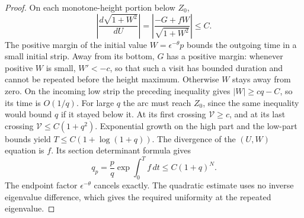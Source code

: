 \begin{proof}
On each monotone-height portion below $Z_0$,
\[
 \left|\frac{d\sqrt{1+W^2}}{dU}\right|
 =\left|\frac{-G+fW}{\sqrt{1+W^2}}\right|\le C.
\]
The positive margin of the initial value
$W=\epsilon^{-\theta}p$ bounds the outgoing time in a small initial
strip.
Away from its bottom, $G$ has a positive margin: whenever positive
$W$ is small, $W'<-c$, so that such a visit has bounded duration
and cannot be repeated before the height maximum. Otherwise $W$
stays away from zero. On the incoming low strip the preceding
inequality gives $|W|\ge cq-C$, so its time is $O(1/q)$.
For large $q$ the arc must reach $Z_0$, since the same inequality
would bound $q$ if it stayed below it. At its first crossing
$\mathcal V\ge c$, and at its last crossing
$\mathcal V\le C(1+q^2)$. Exponential growth on the high part and
the low-part bounds yield $T\le C(1+\log(1+q))$.
The divergence of the $(U,W)$ equation is $f$. Its section determinant
formula gives
\[
 q_p=\frac pq\exp\int_0^T f\,dt\le C(1+q)^N.
\]
The endpoint factor $\epsilon^{-\theta}$ cancels exactly. The
quadratic estimate uses no inverse eigenvalue difference, which gives
the required uniformity at the repeated eigenvalue.
\end{proof}

